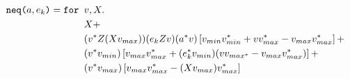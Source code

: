 \begin{align*}
\texttt{neq(}a,e_k\texttt{)}=\texttt{for }&v,X.\\
&X + \\
&(v^* Z(Xv_{max}))(e_{k}Zv)(a^*v)\left[ v_{min}v_{min}^* +vv_{max}^* - v_{max}v_{max}^* \right] + \\ 
&(v^*v_{min}) \left[ v_{max}v_{max}^* + (e_k^*v_{min})(vv_{max^*} - v_{max}v_{max}^*)   \right] + \\
&(v^*v_{max})\left[ v_{max}v_{max}^* - (Xv_{max})v_{max}^* \right]
\end{align*}